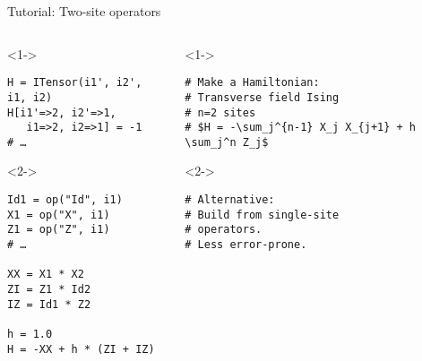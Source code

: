 \begin{frame}[fragile]{Tutorial: Two-site operators}


\begin{columns}

\begin{column}{4.5cm}

\begin{onlyenv}<1->

\begin{lstlisting}[language=JuliaLocal, style=julia, basicstyle=\small]
H = ITensor(i1', i2', i1, i2)
H[i1'=>2, i2'=>1,
   i1=>2, i2=>1] = -1
# …
\end{lstlisting}

\end{onlyenv}

\begin{onlyenv}<2->

\begin{lstlisting}[language=JuliaLocal, style=julia, basicstyle=\small]
Id1 = op("Id", i1)
X1 = op("X", i1)
Z1 = op("Z", i1)
# …

XX = X1 * X2
ZI = Z1 * Id2
IZ = Id1 * Z2

h = 1.0
H = -XX + h * (ZI + IZ)
\end{lstlisting}

\end{onlyenv}

\end{column}

\begin{column}{5.5cm}

\begin{onlyenv}<1->

\begin{lstlisting}[style=julia, numbers=none, mathescape, basicstyle=\small]
# Make a Hamiltonian:
# Transverse field Ising
# n=2 sites
# $H = -\sum_j^{n-1} X_j X_{j+1} + h \sum_j^n Z_j$
\end{lstlisting}

\end{onlyenv}

\begin{onlyenv}<2->

\begin{lstlisting}[style=julia, numbers=none, mathescape, basicstyle=\small]
# Alternative:
# Build from single-site
# operators.
# Less error-prone.






 \end{lstlisting}

\end{onlyenv}

\end{column}

\end{columns}

\end{frame}
